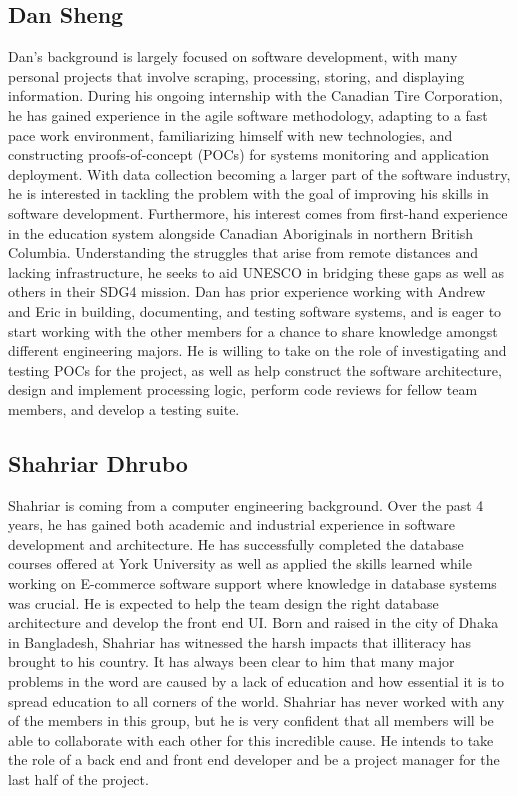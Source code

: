 \documentclass[11pt]{article}
\begin{document}
\subsection*{\textbf{Dan Sheng}}
Dan's background is largely focused on software development, with many personal projects that involve scraping, processing, storing, and displaying information. During his ongoing internship with the Canadian Tire Corporation, he has gained experience in the agile software methodology, adapting to a fast pace work environment, familiarizing himself with new technologies, and constructing proofs-of-concept (POCs) for systems monitoring and application deployment. With data collection becoming a larger part of the software industry, he is interested in tackling the problem with the goal of improving his skills in software development. Furthermore, his interest comes from first-hand experience in the education system alongside Canadian Aboriginals in northern British Columbia. Understanding the struggles that arise from remote distances and lacking infrastructure, he seeks to aid UNESCO in bridging these gaps as well as others in their SDG4 mission. Dan has prior experience working with Andrew and Eric in building, documenting, and testing software systems, and is eager to start working with the other members for a chance to share knowledge amongst different engineering majors. He is willing to take on the role of investigating and testing POCs for the project, as well as help construct the software architecture, design and implement processing logic, perform code reviews for fellow team members, and develop a testing suite. \\

\subsection*{\textbf{Shahriar Dhrubo}}
Shahriar is coming from a computer engineering background. Over the past 4 years, he has gained both academic and industrial experience in software development and architecture. He has successfully completed the database courses offered at York University as well as applied the skills learned while working on E-commerce software support where knowledge in database systems was crucial. He is expected to help the team design the right database architecture and develop the front end UI. Born and raised in the city of Dhaka in Bangladesh, Shahriar has witnessed the harsh impacts that illiteracy has brought to his country. It has always been clear to him that many major problems in the word are caused by a lack of education and how essential it is to spread education to all corners of the world. Shahriar has never worked with any of the members in this group, but he is very confident that all members will be able to collaborate with each other for this incredible cause. He intends to take the role of a back end and front end developer and be a project manager for the last half of the project. \\
\end{document}
